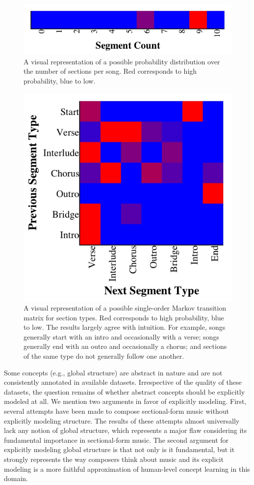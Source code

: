 \documentclass[letterpaper]{article}
\begin{document}
\begin{figure}
	\centering
	\includegraphics[width=.8\linewidth]{segment_count_per_song}
	\caption{\label{fig:segment_count_per_song} A visual representation of a possible probability distribution over the number of sections per song. Red corresponds to high probability, blue to low.}
\end{figure}

\begin{figure}[t]
	\centering
	\includegraphics[width=.8\linewidth]{segment_transitions}
	\caption{\label{fig:segment_transitions} A visual representation of a possible single-order Markov transition matrix for section types. Red corresponds to high probability, blue to low. The results largely agree with intuition. For example, songs generally start with an intro and occasionally with a verse; songs generally end with an outro and occasionally a chorus; and sections of the same type do not generally follow one another.}
\end{figure}

Some concepts (e.g., global structure) are abstract in nature and are not consistently annotated in available datasets. Irrespective of the quality of these datasets, the question remains of whether abstract concepts should be explicitly modeled at all. We mention two arguments in favor of explicitly modeling. First, several attempts have been made to compose sectional-form music without explicitly modeling structure. The results of these attempts almost universally lack any notion of global structure, which represents a major flaw considering its fundamental importance in sectional-form music. The second argument for explicitly modeling global structure is that not only is it fundamental, but it strongly represents the way composers think about music and its explicit modeling is a more faithful approximation of human-level concept learning in this domain.
\end{document}
